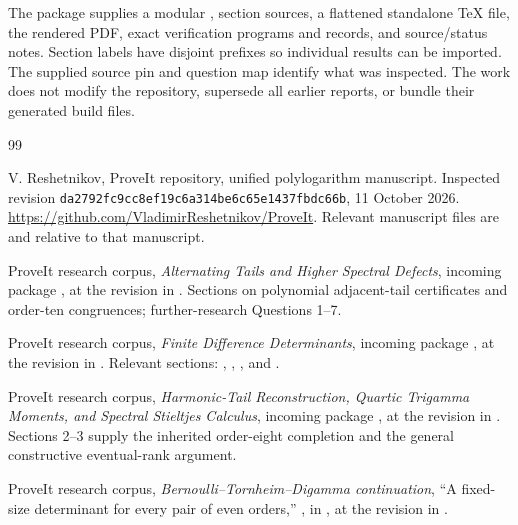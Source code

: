 \documentclass[11pt]{article}
\theoremstyle{definition}
\theoremstyle{remark}
\numberwithin{equation}{section}
\begin{document}
The package supplies a modular , section sources,
a flattened standalone TeX file, the rendered PDF, exact verification
programs and records, and source/status notes. Section labels have
disjoint prefixes so individual results can be imported. The supplied
source pin and question map identify what was inspected. The work
does not modify the repository, supersede all earlier reports, or
bundle their generated build files.


\begin{thebibliography}{99}
\raggedright

V. Reshetnikov, ProveIt repository, unified polylogarithm manuscript.
Inspected revision
\texttt{da2792fc9cc8ef19c6a314be6c65e1437fbdc66b},
11 October 2026.
\url{https://github.com/VladimirReshetnikov/ProveIt}.
Relevant manuscript files are
and  relative to that manuscript.

ProveIt research corpus,
\emph{Alternating Tails and Higher Spectral Defects},
incoming package
,
at the revision in \cite{ProveItPin}.
Sections on polynomial adjacent-tail certificates and order-ten
congruences; further-research Questions 1--7.

ProveIt research corpus, \emph{Finite Difference Determinants},
incoming package
,
at the revision in \cite{ProveItPin}.
Relevant sections:
,
,
, and
.

ProveIt research corpus,
\emph{Harmonic-Tail Reconstruction, Quartic Trigamma Moments,
and Spectral Stieltjes Calculus},
incoming package
,
at the revision in \cite{ProveItPin}.
Sections 2--3 supply the inherited order-eight completion and the
general constructive eventual-rank argument.

ProveIt research corpus, \emph{Bernoulli--Tornheim--Digamma continuation},
``A fixed-size determinant for every pair of even orders,''
, in
,
at the revision in \cite{ProveItPin}.


\end{thebibliography}
\end{document}
